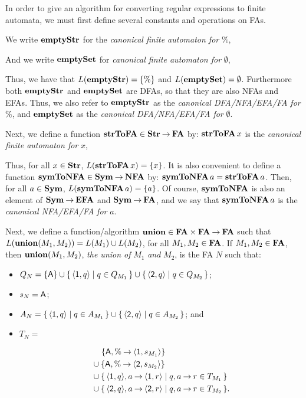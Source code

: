 In order to give an algorithm for converting regular expressions to
finite automata, we must first define several constants and operations
on FAs.

We write $\mathbf{emptyStr}$ for the \emph{canonical finite
automaton for} $\%$,
\begin{center}

\end{center}
And we write $\mathbf{emptySet}$ for \emph{canonical finite automaton for} $\emptyset$,
\begin{center}

\end{center}
Thus, we have that $L(\mathbf{emptyStr})=\{\%\}$ and $L(\mathbf{emptySet})=\emptyset$.
Furthermore both $\mathbf{emptyStr}$ and $\mathbf{emptySet}$ are DFAs, so that they
are also NFAs and EFAs.  Thus, we also refer to $\mathbf{emptyStr}$ as the
\emph{canonical DFA/NFA/EFA/FA for} $\%$, and $\mathbf{emptySet}$ as the
\emph{canonical DFA/NFA/EFA/FA for} $\emptyset$.

Next, we define a function $\mathbf{strToFA}\in\mathbf{Str}\mathbin{\to}\mathbf{FA}$ by:
$\mathbf{strToFA}\,x$ is the \emph{canonical finite automaton for} $x$,
\begin{center}

\end{center}
Thus, for all $x\in\mathbf{Str}$, $L(\mathbf{strToFA}\,x)=\{x\}$.
It is also convenient to define a function $\mathbf{symToNFA}\in\mathbf{Sym}\mathbin{\to}\mathbf{NFA}$
by: $\mathbf{symToNFA}\,a=\mathbf{strToFA}\,a$.  Then, for all $a\in\mathbf{Sym}$,
$L(\mathbf{symToNFA}\,a)=\{a\}$.  Of course, $\mathbf{symToNFA}$ is also an element of
$\mathbf{Sym}\mathbin{\to}\mathbf{EFA}$ and $\mathbf{Sym}\mathbin{\to}\mathbf{FA}$, and we say that $\mathbf{symToNFA}\,a$ is
the \emph{canonical NFA/EFA/FA for} $a$.

Next, we define a function/algorithm $\mathbf{union}\in\mathbf{FA}\times\mathbf{FA}\mathbin{\to}\mathbf{FA}$
such that $L(\mathbf{union}(M_1,M_2))=L(M_1)\cup L(M_2)$, for all
$M_1,M_2\in\mathbf{FA}$.  If $M_1,M_2\in\mathbf{FA}$, then $\mathbf{union}(M_1,M_2)$,
\emph{the union of} $M_1$ \emph{and} $M_2$, is the FA $N$ such that:
\begin{itemize}
\item $Q_N= \{\mathsf{A}\}\cup\{ \, \langle\mathsf{1},q\rangle \mid q\in
    Q_{M_1} \, \}\cup \{ \, \langle\mathsf{2},q\rangle \mid q\in Q_{M_2} \, \}$;

\item $s_N=\mathsf{A}$;

\item $A_N=\{ \, \langle\mathsf{1},q\rangle \mid q\in A_{M_1} \, \}\cup
  \{ \, \langle\mathsf{2},q\rangle \mid q\in A_{M_2} \, \}$; and

\item $T_N={}$

\begin{align*}
  &\quad
  \,\{\mathsf{A},\%\mathbin{\to} \langle\mathsf{1},s_{M_1}\rangle\} \\
  &\cup \{\mathsf{A},\%\mathbin{\to}\langle\mathsf{2},s_{M_2}\rangle\} \\
  &\cup \{ \, \langle\mathsf{1},q\rangle,a\mathbin{\to}\langle\mathsf{1},r\rangle \mid q,
    a\mathbin{\to} r\in T_{M_1} \, \}
  \\
  &\cup \{ \, \langle\mathsf{2},q\rangle,a\mathbin{\to}\langle\mathsf{2},r\rangle \mid q,
    a\mathbin{\to} r \in T_{M_2} \, \}.
\end{align*}
\end{itemize}

